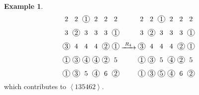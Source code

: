 \documentclass[reqno]{amsart}
\newcommand{\0}{\phantom{c}}
\newcommand{\swt}[1]{\left\langle #1 \right\rangle} %
\theoremstyle{plain}
\theoremstyle{definition}
\newtheorem{example}[thm]{Example}
\numberwithin{equation}{section}
\begin{document}
\begin{example}
\[\begin{tikzpicture}[xscale=0.5,yscale=0.7,every node/.style={inner sep=0.8pt},baseline=55]
\node at (0, 5){2};\node at (1, 5){2};\node[circle, draw=black] at (2, 5){1};\node at (3, 5){2};\node at (4, 5){2};\node at (5, 5){2};\node at (0, 4){3};\node[circle, draw=black] at (1, 4){2};\node at (2, 4){3};\node at (3, 4){3};\node at (4, 4){3};\node[circle, draw=black] at (5, 4){1};\node[circle, draw=black] at (0, 3){3};\node at (1, 3){4};\node at (2, 3){4};\node at (3, 3){4};\node[circle, draw=black] at (4, 3){2};\node[circle, draw=black] at (5, 3){1};\node[circle, draw=black] at (0, 2){1};\node[circle, draw=black] at (1, 2){3};\node[circle, draw=black] at (2, 2){4};\node[circle, draw=black] at (3, 2){4};\node[circle, draw=black] at (4, 2){2};\node at (5, 2){5};\node[circle, draw=black] at (0, 1){1};\node[circle, draw=black] at (1, 1){3};\node at (2, 1){5};\node[circle, draw=black] at (3, 1){4};\node at (4, 1){6};\node[circle, draw=black] at (5, 1){2};\end{tikzpicture}
\xrightarrow[\hspace{15pt}]{R_4}
\begin{tikzpicture}[xscale=0.5,yscale=0.7,every node/.style={inner sep=0.8pt},baseline=55]
\node at (0, 5){2};\node at (1, 5){2};\node[circle, draw=black] at (2, 5){1};\node at (3, 5){2};\node at (4, 5){2};\node at (5, 5){2};\node at (0, 4){3};\node[circle, draw=black] at (1, 4){2};\node at (2, 4){3};\node at (3, 4){3};\node at (4, 4){3};\node[circle, draw=black] at (5, 4){1};\node[circle, draw=black] at (0, 3){3};\node at (1, 3){4};\node at (2, 3){4};\node at (3, 3){4};\node[circle, draw=black] at (4, 3){2};\node[circle, draw=black] at (5, 3){1};\node[circle, draw=black] at (0, 2){1};\node[circle, draw=black] at (1, 2){3};\node at (2, 2){5};\node[circle, draw=black] at (3, 2){4};\node[circle, draw=black] at (4, 2){2};\node at (5, 2){5};\node[circle, draw=black] at (0, 1){1};\node[circle, draw=black] at (1, 1){3};\node[circle, draw=black] at (2, 1){5};\node[circle, draw=black] at (3, 1){4};\node at (4, 1){6};\node[circle, draw=black] at (5, 1){2};
\end{tikzpicture}
\]
which contributes to $\swt{135462}$.
\end{example}
\end{document}
